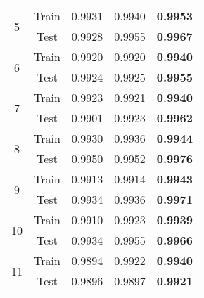 \documentclass[11pt]{article}
\numberwithin{equation}{section}
\theoremstyle{plain}
\theoremstyle{definition}
\begin{document}
\begin{table}[htb!]
{\begin{tabular}{ccccc}
\multirow{2}{*}{5}       & Train                & 0.9931                                & 0.9940       & \textbf{0.9953}                            \\
                         & Test                 & 0.9928                                & 0.9955   & \textbf{0.9967}                                \\\midrule
\multirow{2}{*}{6}       & Train                & 0.9920                                & 0.9920       & \textbf{0.9940}                            \\
                         & Test                 & 0.9924                                & 0.9925    & \textbf{0.9955}                               \\\midrule
\multirow{2}{*}{7}       & Train                & 0.9923                                & 0.9921     & \textbf{0.9940}                              \\
                         & Test                 & 0.9901                                & 0.9923  & \textbf{0.9962}                                 \\\midrule
\multirow{2}{*}{8}       & Train                & 0.9930                                & 0.9936     & \textbf{0.9944}                             \\
                         & Test                 & 0.9950                                & 0.9952  & \textbf{0.9976}                                 \\\midrule
\multirow{2}{*}{9}       & Train                & 0.9913                                & 0.9914     & \textbf{0.9943}                              \\
                         & Test                 & 0.9934                                & 0.9936  & \textbf{0.9971}                                 \\\midrule
\multirow{2}{*}{10}      & Train                & 0.9910                                & 0.9923 & \textbf{0.9939}                                  \\
                         & Test                 & 0.9934                                & 0.9955    & \textbf{0.9966}                               \\\midrule
\multirow{2}{*}{11}      & Train                & 0.9894                                & 0.9922    & \textbf{0.9940}                               \\
                         & Test                 & 0.9896                                & 0.9897   & \textbf{0.9921}                                \\\midrule

\end{tabular}}
\end{table}
\end{document}
